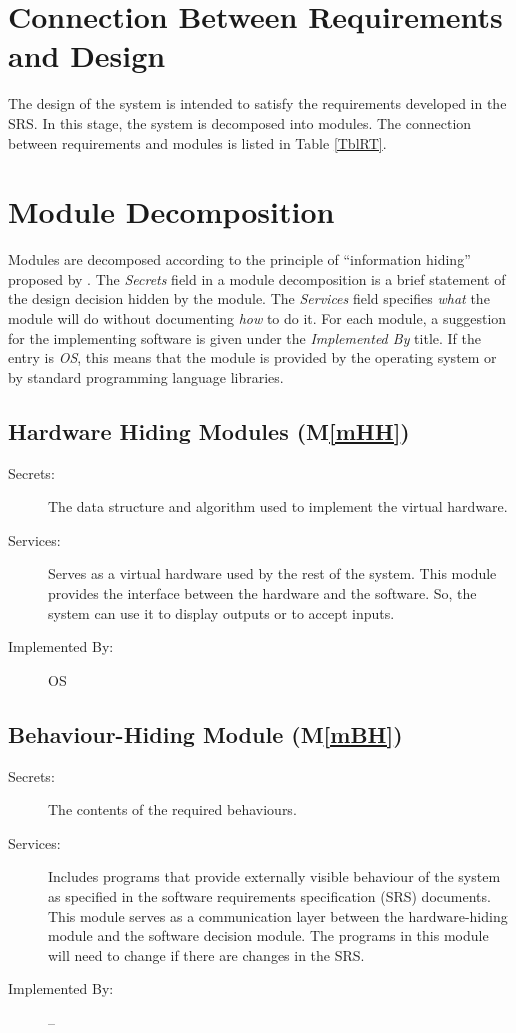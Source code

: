 \documentclass[12pt, titlepage]{article}
\newcommand{\mref}[1]{M\ref{#1}}
\begin{document}
\section{Connection Between Requirements and Design} \label{SecConnection}

The design of the system is intended to satisfy the requirements developed in
the SRS. In this stage, the system is decomposed into modules. The connection
between requirements and modules is listed in Table \ref{TblRT}.

\section{Module Decomposition} \label{SecMD}

Modules are decomposed according to the principle of ``information hiding''
proposed by \citet{ParnasEtAl1984}. The \emph{Secrets} field in a module
decomposition is a brief statement of the design decision hidden by the
module. The \emph{Services} field specifies \emph{what} the module will do
without documenting \emph{how} to do it. For each module, a suggestion for the
implementing software is given under the \emph{Implemented By} title. If the
entry is \emph{OS}, this means that the module is provided by the operating
system or by standard programming language libraries.

\subsection{Hardware Hiding Modules (\mref{mHH})}

\begin{description}
\item[Secrets:]The data structure and algorithm used to implement the virtual
  hardware.
\item[Services:]Serves as a virtual hardware used by the rest of the
  system. This module provides the interface between the hardware and the
  software. So, the system can use it to display outputs or to accept inputs.
\item[Implemented By:] OS
\end{description}

\subsection{Behaviour-Hiding Module (\mref{mBH})}

\begin{description}
\item[Secrets:]The contents of the required behaviours.
\item[Services:]Includes programs that provide externally visible behaviour of
  the system as specified in the software requirements specification (SRS)
  documents. This module serves as a communication layer between the
  hardware-hiding module and the software decision module. The programs in this
  module will need to change if there are changes in the SRS.
\item[Implemented By:] --
\end{description}
\end{document}
